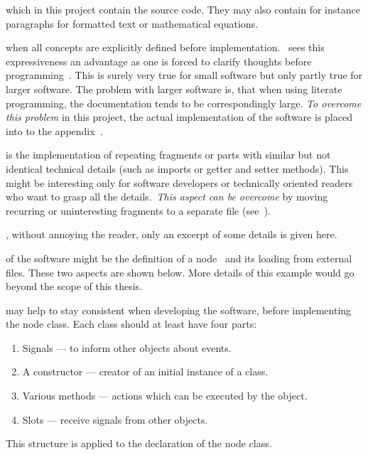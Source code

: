 \documentclass[%
    a4paper,    %
    justified,  %
    nobib,      %
    openany     %
]{tufte-book}
\begin{document}
 which in this project contain the
source code. They may also contain for instance paragraphs for formatted text or
mathematical equations.

 when all concepts are
explicitly defined before implementation.~ sees this
expressiveness an advantage as one is forced to clarify thoughts before
programming~\cite[p. 13]{knuth-lp-1984}. This is surely very true for small
software but only partly true for larger software. The problem with larger
software is, that when using literate programming, the documentation tends to be
correspondingly large. \emph{To overcome this problem} in this project, the
actual implementation of the software is placed into to the
appendix~.

 is the implementation of repeating
fragments or parts with similar but not identical technical details (such as imports
or getter and setter methods). This might be interesting only for
software developers or technically oriented readers who want to grasp all the
details.~\emph{This aspect can
be overcome} by moving recurring or uninteresting fragments to a separate
file (see~).

,
without annoying the reader, only an excerpt of some details is given here.

 of the software might
be the definition of a node~ and its loading from external files. These two aspects are shown
below. More details of this example would go beyond the scope of this thesis.

 may help to stay
consistent when developing the software, before implementing the node class.
Each class should at least have four parts:
\begin{enumerate}
  \item Signals --- to inform other objects about events.
  \item A constructor --- creator of an initial instance of a class.
  \item Various methods --- actions which can be executed by the object.
  \item Slots --- receive signals from other objects.
\end{enumerate}
This structure is applied to the declaration of the node class.
\end{document}
